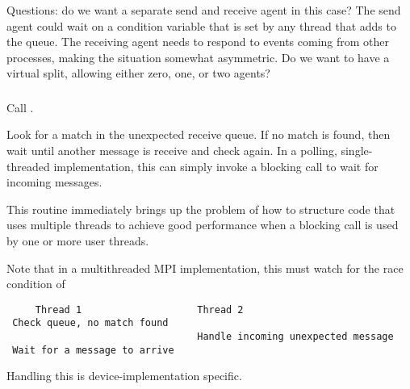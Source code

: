 \documentclass{article}
\begin{document}
Questions: do we want a separate send and receive agent in this case?
The send agent could wait on a condition variable that is set by any
thread that adds to the queue.  The receiving agent needs to respond
to events coming from other processes, making the situation somewhat
asymmetric.  Do we want to have a virtual split, allowing either zero,
one, or two agents?  

\subsubsection{}
\begin{adi3}
Call .
\begin{mmadi}
Look for a match in the unexpected receive queue. 
If no match is found, then wait until another message is receive and check
again.  In a polling, single-threaded implementation, this can simply invoke a
blocking call to wait for incoming messages. 

This routine immediately brings up the problem of how to structure code that
uses multiple threads to achieve good performance when a blocking call is used
by one or more user threads.

Note that in a multithreaded MPI implementation, this must watch for the race
condition of
\begin{verbatim}
     Thread 1                    Thread 2
 Check queue, no match found
                                 Handle incoming unexpected message
 Wait for a message to arrive
\end{verbatim}
Handling this is device-implementation specific.


\end{mmadi}
\end{adi3}
\end{document}
